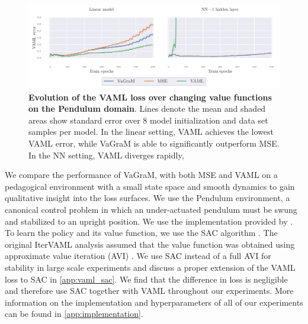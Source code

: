 \begin{figure}[t]
\begin{center}
\includegraphics[width=\linewidth]{figures/vagram/pendulum_joint.pdf}
\end{center}
\caption{\textbf{Evolution of the VAML loss over changing value functions on the Pendulum domain}. Lines denote the mean and shaded areas show standard error over 8 model initialization and data set samples per model. In the linear setting, VAML achieves the lowest VAML error, while VaGraM is able to significantly outperform MSE. In the NN setting, VAML diverges rapidly, }
\label{fig:iterated_pendulum_training}
\end{figure}

We compare the performance of VaGraM, with both MSE and VAML on a pedagogical environment with a small state space and smooth dynamics to gain qualitative insight into the loss surfaces. 
We use the Pendulum environment, a canonical control problem in which an under-actuated pendulum must be swung and stabilized to an upright position.
We use the implementation provided by \cite{brockman2016openai}.
To learn the policy and its value function, we use the SAC algorithm \parencite{sac}.
The original IterVAML analysis assumed that the value function was obtained using approximate value iteration (AVI) \parencite{gordon1995stable,ernst2005tree,farahmand2010error}. We use SAC instead of a full AVI for stability in large scale experiments and discuss a proper extension of the VAML loss to SAC in \autoref{app:vaml_sac}. We find that the difference in loss is negligible and therefore use SAC together with VAML throughout our experiments.
More information on the implementation and hyperparameters of all of our experiments can be found in \autoref{app:implementation}. 

